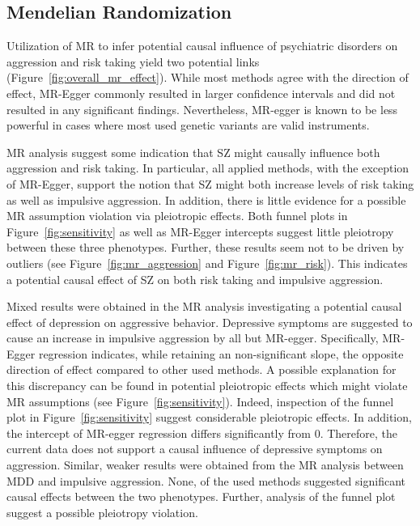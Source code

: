 \subsection{Mendelian Randomization}
\label{sub:mendelian_randomization}

Utilization of MR to infer potential causal influence of psychiatric disorders on aggression and risk taking yield two potential links (Figure~\ref{fig:overall_mr_effect}).
While most methods agree with the direction of effect, MR-Egger commonly resulted in larger confidence intervals and did not resulted in any significant findings.
Nevertheless, MR-egger is known to be less powerful in cases where most used genetic variants are valid instruments.

MR analysis suggest some indication that SZ might causally influence both aggression and risk taking.
In particular, all applied methods, with the exception of MR-Egger, support the notion that SZ might both increase levels of risk taking as well as impulsive aggression.
In addition, there is little evidence for a possible MR assumption violation via pleiotropic effects.
Both funnel plots in Figure~\ref{fig:sensitivity} as well as MR-Egger intercepts suggest little pleiotropy between these three phenotypes.
Further, these results seem not to be driven by outliers (see Figure~\ref{fig:mr_aggression} and Figure~\ref{fig:mr_risk}).
This indicates a potential causal effect of SZ on both risk taking and impulsive aggression.

Mixed results were obtained in the MR analysis investigating a potential causal effect of depression on aggressive behavior.
Depressive symptoms are suggested to cause an increase in impulsive aggression by all but MR-egger.
Specifically, MR-Egger regression indicates, while retaining an non-significant slope, the opposite direction of effect compared to other used methods.  
A possible explanation for this discrepancy can be found in potential pleiotropic effects which might violate MR assumptions (see Figure~\ref{fig:sensitivity}).
Indeed, inspection of the funnel plot in Figure~\ref{fig:sensitivity} suggest considerable pleiotropic effects.
In addition, the intercept of MR-egger regression differs significantly from $0$.
Therefore, the current data does not support a causal influence of depressive symptoms on aggression. 
Similar, weaker results were obtained from the MR analysis between MDD and impulsive aggression.
None, of the used methods suggested significant causal effects between the two phenotypes. 
Further, analysis of the funnel plot suggest a possible pleiotropy violation.

